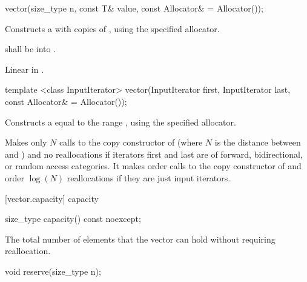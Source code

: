 \begin{itemdecl}
vector(size_type n, const T& value,
       const Allocator& = Allocator());
\end{itemdecl}

\begin{itemdescr}
\pnum
\effects Constructs a  with 
copies of , using the specified allocator.

\pnum
\requires {} shall be
 into .

\pnum
\complexity Linear in .
\end{itemdescr}

\begin{itemdecl}
template <class InputIterator>
  vector(InputIterator first, InputIterator last,
         const Allocator& = Allocator());
\end{itemdecl}

\begin{itemdescr}

\pnum
\effects Constructs a  equal to the
range , using the specified allocator.

\pnum
\complexity
Makes only $N$
calls to the copy constructor of
(where $N$
is the distance between
and
)
and no reallocations if iterators first and last are of forward, bidirectional, or random access categories.
It makes order
calls to the copy constructor of
and order
$\log(N)$
reallocations if they are just input iterators.
\end{itemdescr}

[vector.capacity]{ capacity}

%
\begin{itemdecl}
size_type capacity() const noexcept;
\end{itemdecl}

\begin{itemdescr}
\pnum
\returns
The total number of elements that the vector can hold
without requiring reallocation.
\end{itemdescr}

%
\begin{itemdecl}
void reserve(size_type n);
\end{itemdecl}

